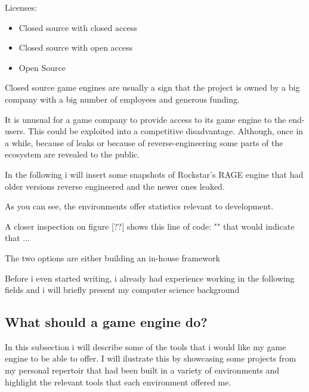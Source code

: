         Licenses:

        \begin{itemize}
            \item Closed source with closed access
            \item Closed source with open access
            \item Open Source
        \end{itemize}

        Closed source game engines are usually a sign that the project is owned by a big company with a big number of employees and generous funding.
        
        It is unusual for a game company to provide access to its game engine to the end-users. This could be exploited into a competitive disadvantage.
        Although, once in a while, because of leaks or because of reverse-engineering some parts of the ecosystem are revealed to the public.

        In the following i will insert some snapshots of Rockstar's RAGE engine that had older versions reverse engineered and the newer ones leaked. 
        

        As you can see, the environments offer statistics relevant to development.

        A closer inspection on figure [??] shows this line of code: "" that would indicate that ...



        The two options are either building an in-house framework 

        Before i even started writing, i already had experience working in the following fields and i will briefly present my computer science background



        \subsection{What should a game engine do?}
            In this subsection i will describe some of the tools that i would like my game engine to be able to offer.
            I will ilustrate this by showcasing some projects from my personal repertoir that had been built in a variety of environments and highlight the relevant tools that each environment offered me.


